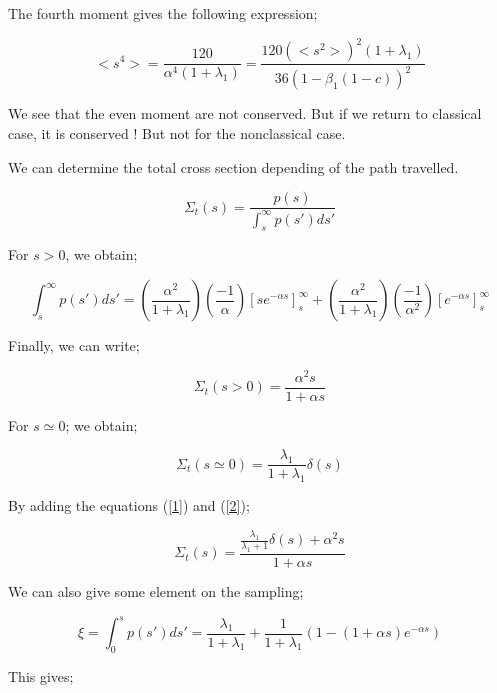 \documentclass[preprint,12pt]{elsarticle}
\newcommand{\bl}{\big<}
\newcommand{\bg}{\big>}
\begin{document}
The fourth moment gives the following expression;

\begin{equation}
\bl s^4 \bg = \frac{120}{\alpha^4 (1+\lambda_1)} = \frac{120 \left(\bl s^2 \bg\right)^2 (1+\lambda_1)}{36 (1-\beta_1(1-c))^2} 
\end{equation}

We see that the even moment are not conserved. But if we return to classical case, it is conserved ! But not for the nonclassical case.

We can determine the total cross section depending of the path travelled.

\begin{equation}
\Sigma_t(s) = \frac{p(s)}{\int_s^\infty p(s') ds'}
\end{equation}

For $s>0$, we obtain;

\begin{equation}
\int_s^\infty p(s')ds' = \left(\frac{\alpha^2}{1+\lambda_1}\right)\left(\frac{-1}{\alpha}\right)\left[se^{-\alpha s}\right]_s^\infty + \left(\frac{\alpha^2}{1+\lambda_1}\right)\left(\frac{-1}{\alpha^2}\right)\left[e^{-\alpha s}\right]_s^\infty 
\end{equation}

Finally, we can write;

\begin{equation}\label{1}
\Sigma_t(s>0) = \frac{\alpha^2s}{1+\alpha s}
\end{equation}

For $s \simeq 0$; we obtain;

\begin{equation}\label{2}
\Sigma_t(s\simeq 0) = \frac{\lambda_1}{1+\lambda_1}\delta(s)
\end{equation}

By adding the equations (\ref{1}) and (\ref{2});

\begin{equation}
\Sigma_t(s) = \frac{\frac{\lambda_1}{\lambda_1 + 1}\delta(s) + \alpha^2 s}{1+\alpha s}
\end{equation}

We can also give some element on the sampling;

\begin{equation}
\xi = \int_0^s p(s')ds' = \frac{\lambda_1}{1+\lambda_1} + \frac{1}{1+\lambda_1}\left(1-(1+\alpha s)e^{-\alpha s}\right)
\end{equation}

This gives;
\end{document}
